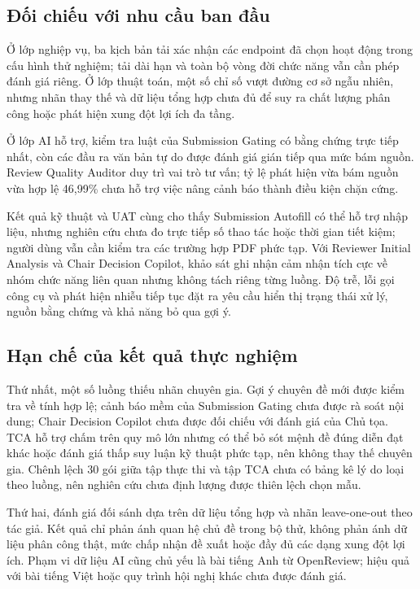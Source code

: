 \subsection{Đối chiếu với nhu cầu ban đầu}

Ở lớp nghiệp vụ, ba kịch bản tải xác nhận các endpoint đã chọn hoạt động trong cấu hình thử nghiệm; tải dài hạn và toàn bộ vòng đời chức năng vẫn cần phép đánh giá riêng. Ở lớp thuật toán, một số chỉ số vượt đường cơ sở ngẫu nhiên, nhưng nhãn thay thế và dữ liệu tổng hợp chưa đủ để suy ra chất lượng phân công hoặc phát hiện xung đột lợi ích đa tầng.

Ở lớp AI hỗ trợ, kiểm tra luật của Submission Gating có bằng chứng trực tiếp nhất, còn các đầu ra văn bản tự do được đánh giá gián tiếp qua mức bám nguồn. Review Quality Auditor duy trì vai trò tư vấn; tỷ lệ phát hiện vừa bám nguồn vừa hợp lệ 46,99\% chưa hỗ trợ việc nâng cảnh báo thành điều kiện chặn cứng.

Kết quả kỹ thuật và UAT cùng cho thấy Submission Autofill có thể hỗ trợ nhập liệu, nhưng nghiên cứu chưa đo trực tiếp số thao tác hoặc thời gian tiết kiệm; người dùng vẫn cần kiểm tra các trường hợp PDF phức tạp. Với Reviewer Initial Analysis và Chair Decision Copilot, khảo sát ghi nhận cảm nhận tích cực về nhóm chức năng liên quan nhưng không tách riêng từng luồng. Độ trễ, lỗi gọi công cụ và phát hiện nhiễu tiếp tục đặt ra yêu cầu hiển thị trạng thái xử lý, nguồn bằng chứng và khả năng bỏ qua gợi ý.

\subsection{Hạn chế của kết quả thực nghiệm}

Thứ nhất, một số luồng thiếu nhãn chuyên gia. Gợi ý chuyên đề mới được kiểm tra về tính hợp lệ; cảnh báo mềm của Submission Gating chưa được rà soát nội dung; Chair Decision Copilot chưa được đối chiếu với đánh giá của Chủ tọa. TCA hỗ trợ chấm trên quy mô lớn nhưng có thể bỏ sót mệnh đề đúng diễn đạt khác hoặc đánh giá thấp suy luận kỹ thuật phức tạp, nên không thay thế chuyên gia. Chênh lệch 30 gói giữa tập thực thi và tập TCA chưa có bảng kê lý do loại theo luồng, nên nghiên cứu chưa định lượng được thiên lệch chọn mẫu.

Thứ hai, đánh giá đối sánh dựa trên dữ liệu tổng hợp và nhãn leave-one-out theo tác giả. Kết quả chỉ phản ánh quan hệ chủ đề trong bộ thử, không phản ánh dữ liệu phân công thật, mức chấp nhận đề xuất hoặc đầy đủ các dạng xung đột lợi ích. Phạm vi dữ liệu AI cũng chủ yếu là bài tiếng Anh từ OpenReview; hiệu quả với bài tiếng Việt hoặc quy trình hội nghị khác chưa được đánh giá.

